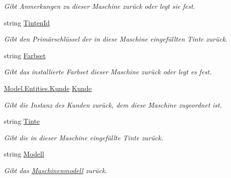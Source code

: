 \begin{DoxyCompactItemize}
\begin{DoxyCompactList}\small\item\em Gibt Anmerkungen zu dieser Maschine zurück oder legt sie fest. \end{DoxyCompactList}\item 
string \hyperlink{class_products_1_1_model_1_1_entities_1_1_kundenmaschine_ae0f77ae6730a30ab90ac5e11c016154f}{Tinten\+Id}
\begin{DoxyCompactList}\small\item\em Gibt den Primärschlüssel der in diese Maschine eingefüllten Tinte zurück. \end{DoxyCompactList}\item 
string \hyperlink{class_products_1_1_model_1_1_entities_1_1_kundenmaschine_a89f725adcc8f48a3e06b4cd9a730878a}{Farbset}
\begin{DoxyCompactList}\small\item\em Gibt das installierte Farbset dieser Maschine zurück oder legt es fest. \end{DoxyCompactList}\item 
\hyperlink{class_products_1_1_model_1_1_entities_1_1_kunde}{Model.\+Entities.\+Kunde} \hyperlink{class_products_1_1_model_1_1_entities_1_1_kundenmaschine_ac884bdb17fbb46dc0bc18f631e8cab1b}{Kunde}
\begin{DoxyCompactList}\small\item\em Gibt die Instanz des Kunden zurück, dem diese Maschine zugeordnet ist. \end{DoxyCompactList}\item 
string \hyperlink{class_products_1_1_model_1_1_entities_1_1_kundenmaschine_ad371528f1113a314be9e3088fbe4cd07}{Tinte}
\begin{DoxyCompactList}\small\item\em Gibt die in dieser Maschine eingefüllte Tinte zurück. \end{DoxyCompactList}\item 
string \hyperlink{class_products_1_1_model_1_1_entities_1_1_kundenmaschine_a7cf4c899e2149dfb7ac4838fc16578c6}{Modell}
\begin{DoxyCompactList}\small\item\em Gibt das \hyperlink{class_products_1_1_model_1_1_entities_1_1_maschinenmodell}{Maschinenmodell} zurück. \end{DoxyCompactList}\item 

\end{DoxyCompactItemize}
